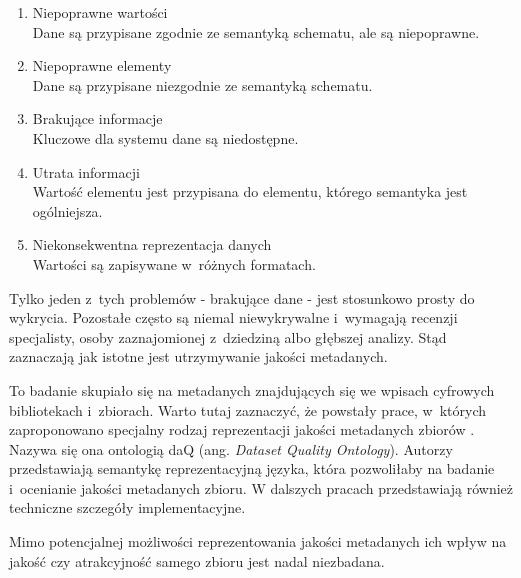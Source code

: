 	\begin{enumerate}
		\item Niepoprawne wartości \\
		Dane są przypisane zgodnie ze semantyką schematu, ale są niepoprawne.

		\item Niepoprawne elementy \\
		Dane są przypisane niezgodnie ze semantyką schematu.

		\item Brakujące informacje \\
		Kluczowe dla systemu dane są niedostępne.

		\item Utrata informacji \\
		Wartość elementu jest przypisana do elementu, którego semantyka jest ogólniejsza.

		\item Niekonsekwentna reprezentacja danych \\
		Wartości są zapisywane w~różnych formatach.
	\end{enumerate}

	Tylko jeden z~tych problemów - brakujące dane - jest stosunkowo prosty do wykrycia.
	Pozostałe często są niemal niewykrywalne i~wymagają recenzji specjalisty, osoby zaznajomionej z~dziedziną albo głębszej analizy.
	Stąd zaznaczają jak istotne jest utrzymywanie jakości metadanych.

	To badanie skupiało się na metadanych znajdujących się we wpisach cyfrowych bibliotekach i~zbiorach.
	Warto tutaj zaznaczyć, że powstały prace, w~których zaproponowano specjalny rodzaj reprezentacji jakości metadanych zbiorów \cite{debattista2014daq}.
	Nazywa się ona ontologią daQ (ang. \emph{Dataset Quality Ontology}).
	Autorzy przedstawiają semantykę reprezentacyjną języka, która pozwoliłaby na badanie i~ocenianie jakości metadanych zbioru.
	W dalszych pracach \cite{debattista2014representing} przedstawiają również techniczne szczegóły implementacyjne.

	Mimo potencjalnej możliwości reprezentowania jakości metadanych ich wpływ na jakość czy atrakcyjność samego zbioru jest nadal niezbadana.

